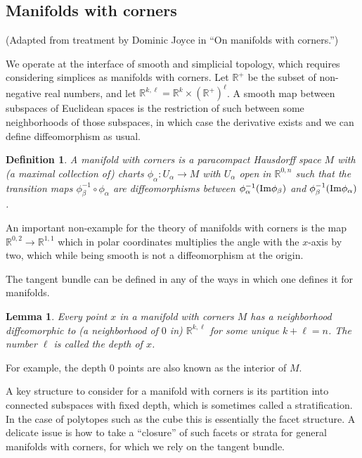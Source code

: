 \documentclass{amsart}          %
\newtheorem{lemma}[theorem]{Lemma}
\newtheorem{definition}[theorem]{Definition}
\newcommand{\R}{\mathbb R}
\begin{document}
\subsection{Manifolds with corners}

(Adapted from treatment by Dominic Joyce in ``On manifolds with corners.'')

We operate at the interface of smooth and simplicial topology, which requires considering simplices as manifolds with corners.
Let $\R^+$ be the subset of non-negative real numbers, and let $\R^{k,\ell} = \R^k \times (\R^+)^\ell$.  A smooth map between
 subspaces of Euclidean spaces is the restriction of such between some neighborhoods of those subspaces, in which case
 the derivative exists and we can define diffeomorphism as usual.

\begin{definition}
A manifold with corners is a paracompact Hausdorff space $M$ with (a maximal collection of) charts $\phi_\alpha : U_\alpha \to M$
with $U_\alpha$ open in  $\R^{0,n}$
such that the transition maps $\phi_\beta^{-1} \circ \phi_\alpha$ are diffeomorphisms between $\phi_\alpha^{-1} ({\rm Im} \phi_\beta)$
and $\phi_\beta^{-1} ({\rm Im} \phi_\alpha)$.  
\end{definition}

An important non-example for the theory of manifolds with corners is the map $\R^{0,2} \to \R^{1,1}$ 
which in polar coordinates multiplies the angle
with the $x$-axis by two, which while being smooth is not a diffeomorphism at the origin.

The tangent bundle can be defined in any of the ways in which one defines it for manifolds. 

\begin{lemma}
Every point $x$ in a manifold with corners $M$ 
has a neighborhood diffeomorphic to (a neighborhood of $0$ in) 
$\R^{k,\ell}$ for some unique $k + \ell = n$.  The number $\ell$
is called the depth of $x$.
\end{lemma}

For example, the depth $0$ points are also known as the interior of $M$.
 
A key structure to consider for a manifold with corners is its partition into connected subspaces with fixed depth, which is sometimes
called a stratification.  In the case of polytopes such as the cube this is essentially the facet structure.   
A delicate issue is how to take a
``closure'' of such facets or strata for general manifolds with corners, for which we rely on the tangent bundle.
\end{document}
